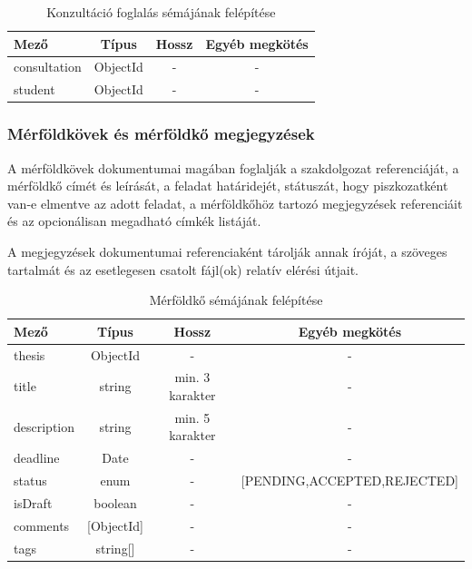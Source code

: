 \documentclass[
]{thesis-ekf}
\theoremstyle{definition}
\theoremstyle{remark}
\begin{document}
	\begin{table}[!h]
		\centering
		\begin{tabular}{|l|c|c|c|} 
			\hline
			\textbf{Mező} & \textbf{Típus} & \textbf{Hossz} & \textbf{Egyéb megkötés} \\ 
			\hline
			consultation & ObjectId & - & - \\ 
			\hline
			student & ObjectId & - & - \\
			\hline
		\end{tabular}
		\caption{Konzultáció foglalás sémájának felépítése}
		\label{tbl:konzultacio_foglalas_dokumentum}
	\end{table}
	
	\subsubsection{Mérföldkövek és mérföldkő megjegyzések}
	A mérföldkövek dokumentumai magában foglalják a szakdolgozat referenciáját, a mérföldkő címét és leírását, a feladat határidejét, státuszát, hogy piszkozatként van-e elmentve az adott feladat, a mérföldkőhöz tartozó megjegyzések referenciáit és az opcionálisan megadható címkék listáját.
	
	A megjegyzések dokumentumai referenciaként tárolják annak íróját, a szöveges tartalmát és az esetlegesen csatolt fájl(ok) relatív elérési útjait.
	
	\begin{table}[!h]
		\centering
		\begin{tabular}{|l|c|c|c|} 
			\hline
			\textbf{Mező} & \textbf{Típus} & \textbf{Hossz} & \textbf{Egyéb megkötés} \\ 
			\hline
			thesis & ObjectId & - & - \\ 
			\hline
			title & string & min. 3 karakter & - \\ 
			\hline
			description & string & min. 5 karakter & - \\ 
			\hline
			deadline & Date & - & - \\ 
			\hline
			status & enum & - & {[}PENDING,ACCEPTED,REJECTED] \\ 
			\hline
			isDraft & boolean & - & - \\ 
			\hline
			comments & {[}ObjectId] & - & - \\ 
			\hline
			tags & string[] & - & - \\
			\hline
		\end{tabular}
		\caption{Mérföldkő sémájának felépítése}
		\label{tbl:merfoldko_dokumentum}
	\end{table}
	
\end{document}
